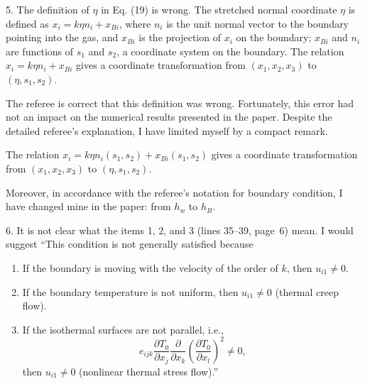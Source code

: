 \documentclass{article}
\newcommand{\pder}[2][]{\frac{\partial#1}{\partial#2}}
\begin{document}
\begin{quoting}
5. The definition of \(\eta\) in Eq. (19) is wrong. The stretched normal
coordinate \(\eta\) is defined as \(x_i = k\eta n_i + x_{Bi}\), where \(n_i\) is the unit normal
vector to the boundary pointing into the gas, and \(x_{Bi}\) is the projection
of \(x_i\) on the boundary; \(x_{Bi}\) and \(n_i\) are functions of \(s_1\) and \(s_2\), a
coordinate system on the boundary. The relation \(x_i = k\eta n_i + x_{Bi}\) gives a
coordinate transformation from \((x_1, x_2, x_3)\) to \((\eta, s_1, s_2)\).
\end{quoting}

The referee is correct that this definition was wrong.
Fortunately, this error had not an impact on the numerical results presented in the paper.
Despite the detailed referee's explanation, I have limited myself by a compact remark.
\begin{leftbar}
The relation \( x_i = k\eta n_i(s_1,s_2) + x_{Bi}(s_1, s_2) \) gives a coordinate transformation
from \((x_1,x_2,x_3)\) to \((\eta,s_1,s_2)\).
\end{leftbar}
Moreover, in accordance with the referee's notation for boundary condition,
I have changed mine in the paper: from \(h_w\) to \(h_B\).

\begin{quoting}
6. It is not clear what the items 1, 2, and 3 (lines 35--39, page~6)
mean. I would suggest ``This condition is not generally satisfied because
\begin{enumerate}
\item If the boundary is moving with the velocity of the order of \(k\), then \(u_{i1} \neq 0\).
\item If the boundary temperature is not uniform, then \(u_{i1} \neq 0\) (thermal creep flow).
\item If the isothermal surfaces are not parallel, i.e.,
\[e_{ijk}\pder[T_0]{x_j}\pder{x_k}\left(\pder[T_0]{x_l}\right)^2 \neq 0, \]
then \(u_{i1} \neq 0\) (nonlinear thermal stress flow).''
\end{enumerate}
\end{quoting}
\end{document}
